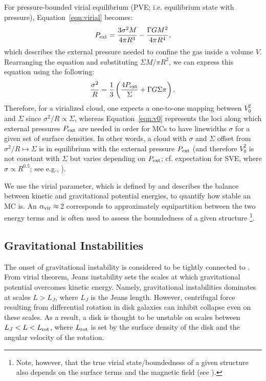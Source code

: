 \IfFileExists{emulateapjlegacy.cls}{\documentclass[iop]{emulateapjlegacy}}{\documentclass[iop]{emulateapj}}
\begin{document}
For pressure-bounded virial equilibrium (PVE; i.e. equilibrium state with pressure), %
Equation~\ref{eqn:virial} becomes:
\begin{equation}
P_{\rm ext} = \frac{3\sigma^2M}{4\pi R^3} - \frac{\Gamma G M^2}{4\pi R^4},
\label{eqn:pext}
\end{equation}
which describes the external pressure needed to confine the gas inside a volume $V$.
Rearranging the equation and substituting $\Sigma$\eq$M/\pi R^2$, we can express
this equation using the following:
\begin{equation}
\frac{\sigma^2}{R} = \frac{1}{3}\left(\frac{4P_{\rm ext}}{\Sigma} + \Gamma G \Sigma \pi \right).
\label{eqn:v0}
\end{equation}
Therefore, for a virialized cloud, one expects a one-to-one mapping between $V_0^2$ and $\Sigma$ since
$\sigma^2/R\propto\Sigma$, whereas
Equation~\ref{eqn:v0} represents the loci along which external pressures $P_{\rm ext}$ are
needed in order for MCs to have linewidths $\sigma$ for a given set of surface densities. %
In other words, a cloud with $\sigma$ and $\Sigma$ offset from $\sigma^2/R\mapsto\Sigma$
is in equilibrium with the external pressure $P_{\rm ext}$ (and therefore $V_0^2$ is not constant with $\Sigma$ but
varies depending on $P_{\rm ext}$; cf. expectation for SVE, where
$\sigma\propto R^{0.5}$; see e.g., \citealt{Heyer09a, Hughes10a, Hughes13b, Meidt13a}).

We use the virial parameter, which is defined by  and describes
the balance between kinetic and gravitational potential energies,
to quantify how stable an MC is.
An $\alpha_{\rm vir}\approx$\,2 corresponds to approximately equipartition between the two energy terms
and is often used to assess the boundedness of a given structure \citep[see e.g., ][]{Kauffmann17b}\footnote{Note, however, that
the true virial state/boundedness of a given structure also depends on the surface terms and the magnetic field (see ).}.

\subsection{Gravitational Instabilities}   \label{sec:Q}
The onset of gravitational instability is considered to be tightly connected to \SF \citep[e.g.,][]{Kennicutt89a, Wang94a, Li05b, Li06a}.
From virial theorem, Jeans 
instability sets the scales at which gravitational potential overcomes kinetic energy. Namely, gravitational instabilities 
dominates at scales $L > L_J$, where $L_J$ is the Jeans length. 
However, centrifugal force resulting from differential rotation in disk galaxies can 
inhibit collapse even on these scales. As a result, a disk is thought to be 
unstable on scales between $L_J < L < L_{\rm rot}$, where $L_{\rm rot}$ is set 
by the surface density of the disk and the angular velocity of the rotation. 
\end{document}
